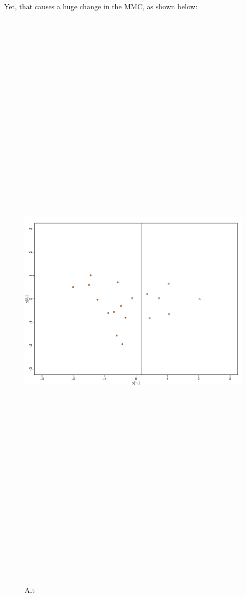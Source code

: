 \documentclass[
]{article}
\begin{document}
Yet, that causes a huge change in the MMC, as shown below:

\begin{figure}
\centering
\includegraphics[width=1\textwidth,height=12.5in]{MMConepointorehyperplane.pdf}
\caption{Alt}
\end{figure}
\end{document}
